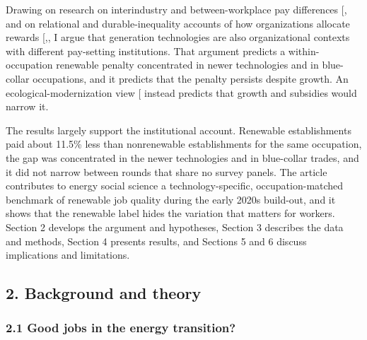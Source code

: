 \documentclass[
  11pt,
]{article}
\begin{document}
Drawing on research on interindustry and between-workplace pay
differences
{[},\citeproc{ref-card2013workplace}{7}{]}
and on relational and durable-inequality accounts of how organizations
allocate rewards
{[},\citeproc{ref-tomaskovicdevey2019relational}{9}{]},
I argue that generation technologies are also organizational contexts
with different pay-setting institutions. That argument predicts a
within-occupation renewable penalty concentrated in newer technologies
and in blue-collar occupations, and it predicts that the penalty
persists despite growth. An ecological-modernization view
{[}\citeproc{ref-spaargaren1992sociology}{10}{]} instead predicts that
growth and subsidies would narrow it.

The results largely support the institutional account. Renewable
establishments paid about 11.5\% less than nonrenewable establishments
for the same occupation, the gap was concentrated in the newer
technologies and in blue-collar trades, and it did not narrow between
rounds that share no survey panels. The article contributes to energy
social science a technology-specific, occupation-matched benchmark of
renewable job quality during the early 2020s build-out, and it shows
that the renewable label hides the variation that matters for workers.
Section 2 develops the argument and hypotheses, Section 3 describes the
data and methods, Section 4 presents results, and Sections 5 and 6
discuss implications and limitations.

\subsection{2. Background and theory}\label{background-and-theory}

\subsubsection{2.1 Good jobs in the energy
transition?}\label{good-jobs-in-the-energy-transition}
\end{document}

